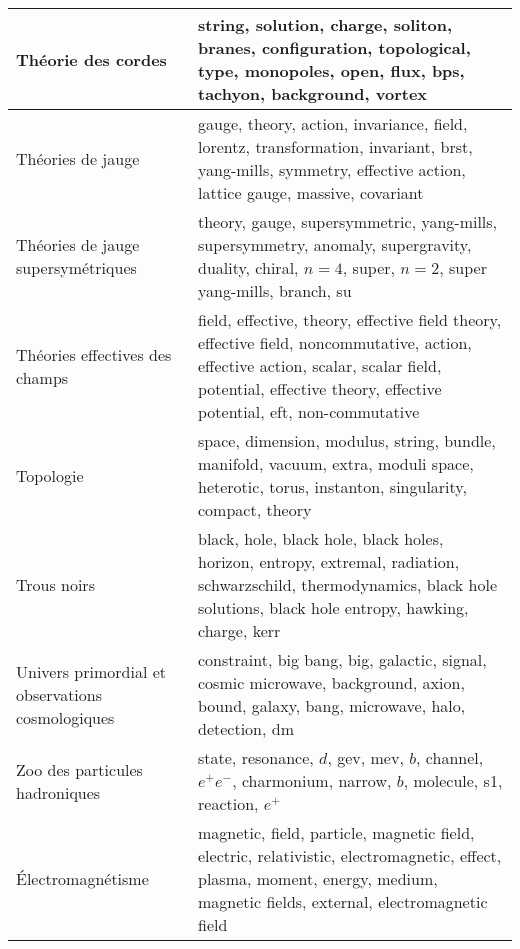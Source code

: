 \begin{longtable}[H]{p{}|p{}}
Théorie des cordes                                              &                                                                       string, solution, charge, soliton, branes, configuration, topological, type, monopoles, open, flux, bps, tachyon, background, vortex \\ \midrule
Théories de jauge                                               &                                              gauge, theory, action, invariance, field, lorentz, transformation, invariant, brst, yang-mills, symmetry, effective action, lattice gauge, massive, covariant \\ \midrule
Théories de jauge supersymétriques                              &                                                        theory, gauge, supersymmetric, yang-mills, supersymmetry, anomaly, supergravity, duality, chiral, $n=4$, super, $n=2$, super yang-mills, branch, su \\ \midrule
Théories effectives des champs                                  &  field, effective, theory, effective field theory, effective field, noncommutative, action, effective action, scalar, scalar field, potential, effective theory, effective potential, eft, non-commutative \\ \midrule
Topologie                                                       &                                                                space, dimension, modulus, string, bundle, manifold, vacuum, extra, moduli space, heterotic, torus, instanton, singularity, compact, theory \\ \midrule
Trous noirs                                                     &                                black, hole, black hole, black holes, horizon, entropy, extremal, radiation, schwarzschild, thermodynamics, black hole solutions, black hole entropy, hawking, charge, kerr \\ \midrule
Univers primordial et observations cosmologiques                &                                                                      constraint, big bang, big, galactic, signal, cosmic microwave, background, axion, bound, galaxy, bang, microwave, halo, detection, dm \\ \midrule
Zoo des particules hadroniques                                  &                                                                                            state, resonance, $d$, gev, mev, $b$, channel, $e^+e^-$, charmonium, narrow, $b$, molecule, s1, reaction, $e^+$ \\ \midrule
Électromagnétisme                                               &                               magnetic, field, particle, magnetic field, electric, relativistic, electromagnetic, effect, plasma, moment, energy, medium, magnetic fields, external, electromagnetic field \\ \midrule

\end{longtable}

